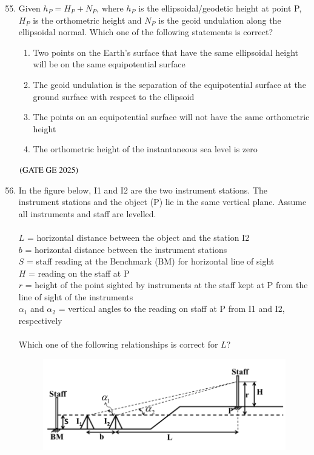 \documentclass[journal,12pt,onecolumn]{IEEEtran}
\theoremstyle{remark}
\begin{document}
\begin{enumerate}
\setcounter{enumi}{54}
\item Given $h_P = H_P + N_P$, where $h_P$ is the ellipsoidal/geodetic height at point P, $H_P$ is the orthometric height and $N_P$ is the geoid undulation along the ellipsoidal normal. Which one of the following statements is correct?
\begin{enumerate}
\item Two points on the Earth's surface that have the same ellipsoidal height will be on the same equipotential surface
\item The geoid undulation is the separation of the equipotential surface at the ground surface with respect to the ellipsoid
\item The points on an equipotential surface will not have the same orthometric height
\item The orthometric height of the instantaneous sea level is zero
\end{enumerate}
\hfill $\left(\text{GATE GE 2025}\right)$
\bigskip
\item In the figure below, I1 and I2 are the two instrument stations. The instrument stations and the object (P) lie in the same vertical plane. Assume all instruments and staff are levelled. \\
\\
$L$ = horizontal distance between the object and the station I2 \\
$b$ = horizontal distance between the instrument stations \\
$S$ = staff reading at the Benchmark (BM) for horizontal line of sight \\
$H$ = reading on the staff at P \\
$r$ = height of the point sighted by instruments at the staff kept at P from the line of sight of the instruments \\
$\alpha_1$ and $\alpha_2$ = vertical angles to the reading on staff at P from I1 and I2, respectively \\
\\
Which one of the following relationships is correct for $L$?
\begin{figure}[H]
    \centering
    \includegraphics[width=0.7\columnwidth]{figs/fig9.png}

\end{figure}
\end{enumerate}
\end{document}
